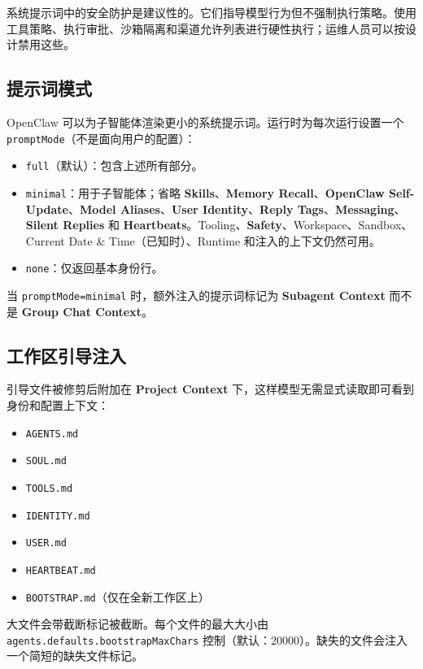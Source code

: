 系统提示词中的安全防护是建议性的。它们指导模型行为但不强制执行策略。使用工具策略、执行审批、沙箱隔离和渠道允许列表进行硬性执行；运维人员可以按设计禁用这些。

\subsection{提示词模式}


OpenClaw 可以为子智能体渲染更小的系统提示词。运行时为每次运行设置一个 \texttt{promptMode}（不是面向用户的配置）：

\begin{itemize}
  \item \texttt{full}（默认）：包含上述所有部分。
  \item \texttt{minimal}：用于子智能体；省略 \textbf{Skills}、\textbf{Memory Recall}、\textbf{OpenClaw Self-Update}、\textbf{Model Aliases}、\textbf{User Identity}、\textbf{Reply Tags}、\textbf{Messaging}、\textbf{Silent Replies} 和 \textbf{Heartbeats}。Tooling、\textbf{Safety}、Workspace、Sandbox、Current Date \& Time（已知时）、Runtime 和注入的上下文仍然可用。
  \item \texttt{none}：仅返回基本身份行。
\end{itemize}


当 \texttt{promptMode=minimal} 时，额外注入的提示词标记为 \textbf{Subagent Context} 而不是 \textbf{Group Chat Context}。

\subsection{工作区引导注入}


引导文件被修剪后附加在 \textbf{Project Context} 下，这样模型无需显式读取即可看到身份和配置上下文：

\begin{itemize}
  \item \texttt{AGENTS.md}
  \item \texttt{SOUL.md}
  \item \texttt{TOOLS.md}
  \item \texttt{IDENTITY.md}
  \item \texttt{USER.md}
  \item \texttt{HEARTBEAT.md}
  \item \texttt{BOOTSTRAP.md}（仅在全新工作区上）
\end{itemize}


大文件会带截断标记被截断。每个文件的最大大小由 \texttt{agents.defaults.bootstrapMaxChars} 控制（默认：20000）。缺失的文件会注入一个简短的缺失文件标记。

